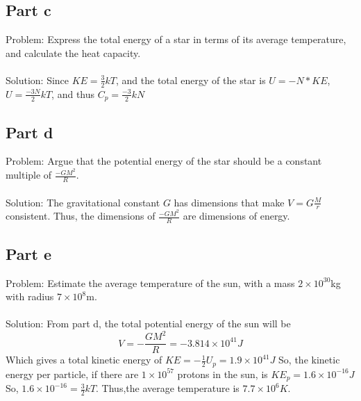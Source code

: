 \documentclass[paper=a4, fontsize=11pt]{scrartcl} %
\numberwithin{equation}{section} %
\numberwithin{figure}{section} %
\numberwithin{table}{section} %
\begin{document}
\subsection*{Part c}
Problem: Express the total energy of a star in terms of its average temperature, and
calculate the heat capacity.
\\
\\
Solution:
Since $KE = \frac{3}{2}kT$, and the total energy of the star is $U=-N*KE$,
$U = \frac{-3N}{2}kT$, and thus $C_p = \frac{-3}{2}kN$

\subsection*{Part d}
Problem: Argue that the potential energy of the star should be a constant multiple of
$\frac{-GM^2}{R}$.
\\
\\
Solution: The gravitational constant $G$ has dimensions that make $V = G\frac{M}{r}$ consistent.
Thus, the dimensions of $\frac{-GM^2}{R}$ are dimensions of energy.

\subsection*{Part e}
Problem: Estimate the average temperature of the sun, with a mass $2\times 10^{30}$kg with radius
$7\times 10^8$m.
\\
\\
Solution: From part d, the total potential energy of the sun will be
\[
V = -\frac{GM^2}{R} = -3.814\times 10^{41}J
\]
Which gives a total kinetic energy of $KE = -\frac{1}{2}U_p = 1.9\times 10^{41}J$
So, the kinetic energy per particle, if there are $1\times 10^{57}$ protons in the sun,
is $KE_{p} = 1.6\times 10^{-16}J$
So, $1.6\times 10^{-16} = \frac{3}{2}kT$. Thus,the average temperature is $7.7\times 10^6K$.



\end{document}
